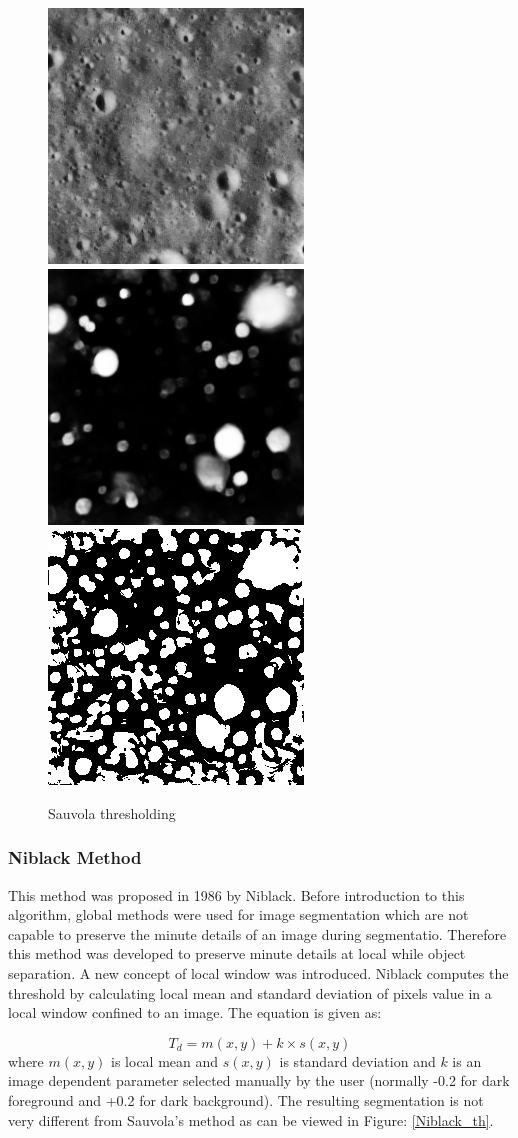 \documentclass[11pt]{article}
\begin{document}
\begin{figure}[H]
	\includegraphics[width=.3\textwidth]{files/results/26.png}\hfill
	\includegraphics[width=.3\textwidth]{files/results/26_predict.png}\hfill
	\includegraphics[width=.3\textwidth]{files/results/sauvola.png}
	\caption{Sauvola thresholding}
	\label{sauvola thresholding}
\end{figure}

\subsubsection{Niblack Method}
This method was proposed in 1986 by Niblack. Before introduction to this algorithm, global methods were used for image segmentation which are not capable to preserve the minute details of an image during segmentatio. Therefore this method was developed to preserve minute details at local while object separation. A new concept of local window was introduced. Niblack computes the threshold by calculating local mean and standard deviation of pixels value in a local window confined to an image. The equation is given as:

\begin{equation}
T_{d}=m(x, y)+k \times s(x, y)
\end{equation}
where $m(x, y)$ is local mean and $s(x, y)$ is standard deviation and $k$ is an image dependent parameter selected manually by the user (normally -0.2 for dark foreground and +0.2 for dark background). The resulting segmentation is not very different from Sauvola's method as can be viewed in Figure: \ref{Niblack_th}.
\end{document}
